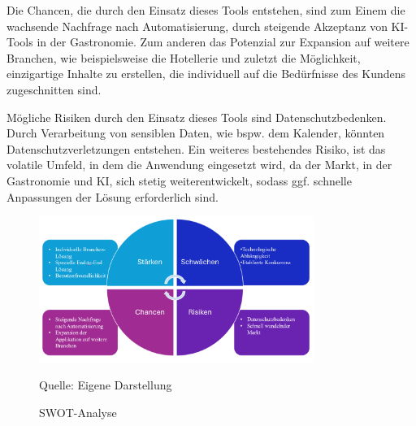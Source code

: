 Die Chancen, die durch den Einsatz dieses Tools entstehen, sind zum Einem die wachsende Nachfrage nach Automatisierung, durch steigende Akzeptanz von KI-Tools in der Gastronomie.
Zum anderen das Potenzial zur Expansion auf weitere Branchen, wie beispielsweise die Hotellerie und zuletzt die Möglichkeit, einzigartige Inhalte zu erstellen, die individuell auf die Bedürfnisse des Kundens zugeschnitten sind.

Mögliche Risiken durch den Einsatz dieses Tools sind Datenschutzbedenken.
Durch Verarbeitung von sensiblen Daten, wie bspw. dem Kalender, könnten Datenschutzverletzungen entstehen.
Ein weiteres bestehendes Risiko, ist das volatile Umfeld, in dem die Anwendung eingesetzt wird, da der Markt, in der Gastronomie und KI, sich stetig weiterentwickelt, sodass ggf. schnelle Anpassungen der Lösung erforderlich sind.

\begin{figure}[htbp]
    \centering
    \includegraphics[width=0.8\textwidth]{abbildungen/SWOT}
    \caption{SWOT-Analyse}
    \label{fig:SWOT-Analyse}
    \vspace{0.5cm}
    \raggedright Quelle: Eigene Darstellung
\end{figure}

